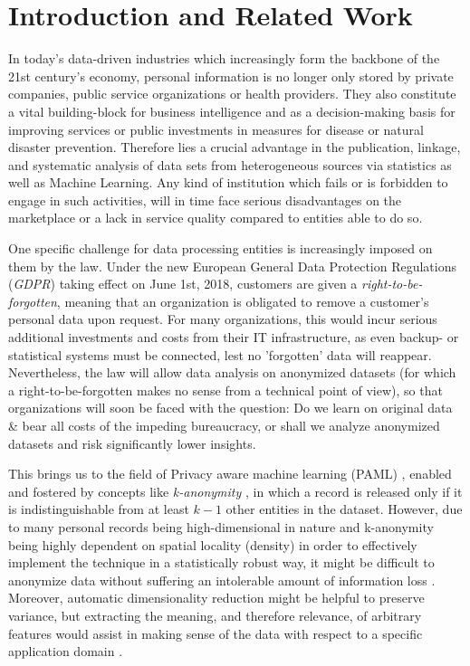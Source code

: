 \documentclass{llncs}
\begin{document}
\renewcommand{\thesubfigure}{\thefigure.\arabic{subfigure}}
\makeatletter
\renewcommand{\p@subfigure}{}
\renewcommand{\@thesubfigure}{\thesubfigure:\hskip\subfiglabelskip}
\makeatother


\section{Introduction and Related Work}
\label{sect:introduction}

In today's data-driven industries which increasingly form the backbone of the 21st century's economy, personal information is no longer only stored by private companies, public service organizations or health providers. They also constitute a vital building-block for business intelligence and as a decision-making basis for improving services or public investments in measures for disease or natural disaster prevention. Therefore lies a crucial advantage in the publication, linkage, and systematic analysis of data sets from heterogeneous sources via statistics as well as Machine Learning. Any kind of institution which fails or is forbidden to engage in such activities, will in time face serious disadvantages on the marketplace or a lack in service quality compared to entities able to do so.

One specific challenge for data processing entities is increasingly imposed on them by the law. Under the new European General Data Protection Regulations (\textit{GDPR}) taking effect on June 1st, 2018, customers are given a \textit{right-to-be-forgotten}, meaning that an organization is obligated to remove a customer's personal data upon request. For many organizations, this would incur serious additional investments and costs from their IT infrastructure, as even backup- or statistical systems must be connected, lest no 'forgotten' data will reappear. Nevertheless, the law will allow data analysis on anonymized datasets (for which a right-to-be-forgotten makes no sense from a technical point of view), so that organizations will soon be faced with the question: Do we learn on original data \& bear all costs of the impeding bureaucracy, or shall we analyze anonymized datasets and risk significantly lower insights.

This brings us to the field of Privacy aware machine learning (PAML) \cite{DuchiJordan:2014:PrivacyAwareLearning}, enabled and fostered by concepts like \textit{k-anonymity} \cite{Samarati:2001:kAnonymity}, in which a record is released only if it is indistinguishable from at least $k-1$ other entities in the dataset. However, due to many personal records being high-dimensional in nature and k-anonymity being highly dependent on spatial locality (density) in order to effectively implement the technique in a statistically robust way, it might be difficult to anonymize data without suffering an intolerable amount of information loss \cite{Aggarwal:2005:kAnonymity}. Moreover, automatic dimensionality reduction might be helpful to preserve variance, but extracting the meaning, and therefore relevance, of arbitrary features would assist in making sense of the data with respect to a specific application domain \cite{Holzinger:2017:InauguralMAKE}.
\end{document}
